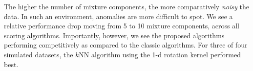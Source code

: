 The higher the number of mixture components, the more comparatively \emph{noisy} the data.  In such
  an environment, anomalies are more difficult to spot.  We see a relative performance drop moving
  from 5 to 10 mixture components, across all scoring algorithms.  Importantly, however, we see the proposed algorithms performing competitively as compared to the classic algorithms.  For three of four simulated datasets, the $k$NN algorithm using the 1-d rotation kernel performed best.
  
